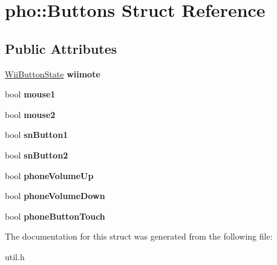 \hypertarget{structpho_1_1Buttons}{\section{pho\-:\-:Buttons Struct Reference}
\label{structpho_1_1Buttons}
}
\subsection*{Public Attributes}
\begin{DoxyCompactItemize}
\item 
\hypertarget{structpho_1_1Buttons_ad98663dc38ea19e05acb20cb1726fac4}{\hyperlink{classpho_1_1WiiButtonState}{Wii\-Button\-State} {\bfseries wiimote}}\label{structpho_1_1Buttons_ad98663dc38ea19e05acb20cb1726fac4}

\item 
\hypertarget{structpho_1_1Buttons_a680e4b82f639fc59cb0ee9a751a98671}{bool {\bfseries mouse1}}\label{structpho_1_1Buttons_a680e4b82f639fc59cb0ee9a751a98671}

\item 
\hypertarget{structpho_1_1Buttons_a533d8810438659b329ad87e044a74edb}{bool {\bfseries mouse2}}\label{structpho_1_1Buttons_a533d8810438659b329ad87e044a74edb}

\item 
\hypertarget{structpho_1_1Buttons_a31c8503c8087311a0b91133fd9c95cb8}{bool {\bfseries sn\-Button1}}\label{structpho_1_1Buttons_a31c8503c8087311a0b91133fd9c95cb8}

\item 
\hypertarget{structpho_1_1Buttons_a02a2249c571a454f53a908735a22d66a}{bool {\bfseries sn\-Button2}}\label{structpho_1_1Buttons_a02a2249c571a454f53a908735a22d66a}

\item 
\hypertarget{structpho_1_1Buttons_a208cc9a8d960e7b3a3f3e6854a1cf909}{bool {\bfseries phone\-Volume\-Up}}\label{structpho_1_1Buttons_a208cc9a8d960e7b3a3f3e6854a1cf909}

\item 
\hypertarget{structpho_1_1Buttons_ab403d4cd5169702a714bb2f2d479ff74}{bool {\bfseries phone\-Volume\-Down}}\label{structpho_1_1Buttons_ab403d4cd5169702a714bb2f2d479ff74}

\item 
\hypertarget{structpho_1_1Buttons_ac506deb5bf06d3a7480eda5f9317b406}{bool {\bfseries phone\-Button\-Touch}}\label{structpho_1_1Buttons_ac506deb5bf06d3a7480eda5f9317b406}

\end{DoxyCompactItemize}


The documentation for this struct was generated from the following file\-:\begin{DoxyCompactItemize}
\item 
util.\-h\end{DoxyCompactItemize}
